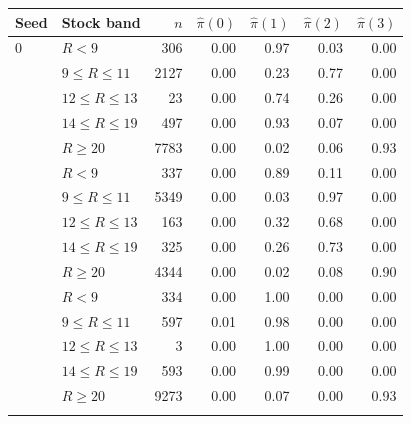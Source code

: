 \begin{tabular}{llrrrrr}
\toprule
Seed & Stock band & $n$ & $\hat\pi(0)$ & $\hat\pi(1)$ & $\hat\pi(2)$ & $\hat\pi(3)$ \\
\midrule
0 & $R<9$ & 306 & 0.00 & 0.97 & 0.03 & 0.00 \\
 & $9\le R\le 11$ & 2127 & 0.00 & 0.23 & 0.77 & 0.00 \\
 & $12\le R\le 13$ & 23 & 0.00 & 0.74 & 0.26 & 0.00 \\
 & $14\le R\le 19$ & 497 & 0.00 & 0.93 & 0.07 & 0.00 \\
 & $R\ge 20$ & 7783 & 0.00 & 0.02 & 0.06 & 0.93 \\
\addlinespace
1 & $R<9$ & 337 & 0.00 & 0.89 & 0.11 & 0.00 \\
 & $9\le R\le 11$ & 5349 & 0.00 & 0.03 & 0.97 & 0.00 \\
 & $12\le R\le 13$ & 163 & 0.00 & 0.32 & 0.68 & 0.00 \\
 & $14\le R\le 19$ & 325 & 0.00 & 0.26 & 0.73 & 0.00 \\
 & $R\ge 20$ & 4344 & 0.00 & 0.02 & 0.08 & 0.90 \\
\addlinespace
2 & $R<9$ & 334 & 0.00 & 1.00 & 0.00 & 0.00 \\
 & $9\le R\le 11$ & 597 & 0.01 & 0.98 & 0.00 & 0.00 \\
 & $12\le R\le 13$ & 3 & 0.00 & 1.00 & 0.00 & 0.00 \\
 & $14\le R\le 19$ & 593 & 0.00 & 0.99 & 0.00 & 0.00 \\
 & $R\ge 20$ & 9273 & 0.00 & 0.07 & 0.00 & 0.93 \\
\addlinespace
\bottomrule
\end{tabular}
